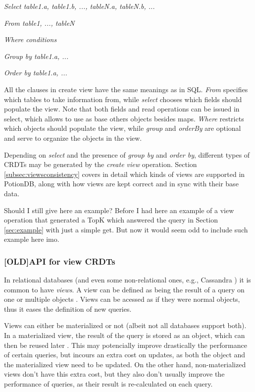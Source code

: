 \documentclass{vldb}
\newcommand{\grumbler}[2]{{\color{red}{\bf #1:} #2}}
\newcommand{\andre}[1]{\grumbler{andre}{#1}}
\newcommand{\emphvspace}{0.5\baselineskip}
\newcommand{\middleblockemph}[1]{\hspace{2em}\emph{#1}}
\newcommand{\lastblockemph}[1]{\hspace{2em}\emph{#1}\vspace{\emphvspace}}
\begin{document}
\middleblockemph{Select table1.a, table1.b, ..., tableN.a, tableN.b, ...}

\middleblockemph{From table1, ..., tableN}

\middleblockemph{Where conditions}

\middleblockemph{Group by table1.a, ...}

\lastblockemph{Order by table1.a, ...}

All the clauses in create view have the same meanings as in SQL.
\emph{From} specifies which tables to take information from, while \emph{select} chooses which fields should populate the view. 
Note that both fields and read operations can be issued in select, which allows to use as base others objects besides maps.
\emph{Where} restricts which objects should populate the view, while \emph{group} and \emph{orderBy} are optional and serve to organize the objects in the view.

Depending on \emph{select} and the presence of \emph{group by} and \emph{order by}, different types of CRDTs may be generated by the \emph{create view} operation.
Section \ref{subsec:viewsconsistency} covers in detail which kinds of views are supported in PotionDB, along with how views are kept correct and in sync with their base data.

\andre{Should I still give here an example? Before I had here an example of a view operation that generated a TopK which answered the query in Section \ref{sec:example} with just a simple get. But now it would seem odd to include such example here imo.}

\subsubsection{[OLD]API for view CRDTs}
\label{subsubsec:OLDAPIView}

In relational databases (and even some non-relational ones, e.g., Cassandra \cite{???}) it is common to have \emph{views}. 
A view can be defined as being the result of a query on one or multiple objects \cite{???}.
Views can be acessed as if they were normal objects, thus it eases the definition of new queries.

Views can either be materialized or not (albeit not all databases support both). %
In a materialized view, the result of the query is stored as an object, which can then be reused later \cite{???}.
This may potencially improve drastically the performance of certain queries, but incours an extra cost on updates, as both the object and the materialized view need to be updated.
On the other hand, non-materialized views don't have this extra cost, but they also don't usually improve the performance of queries, as their result is re-calculated on each query.
\end{document}
